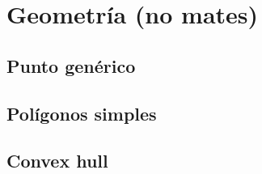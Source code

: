 \chapter{Geometría (no mates)}
\section{Punto genérico}
\section{Polígonos simples}
\section{Convex hull}
